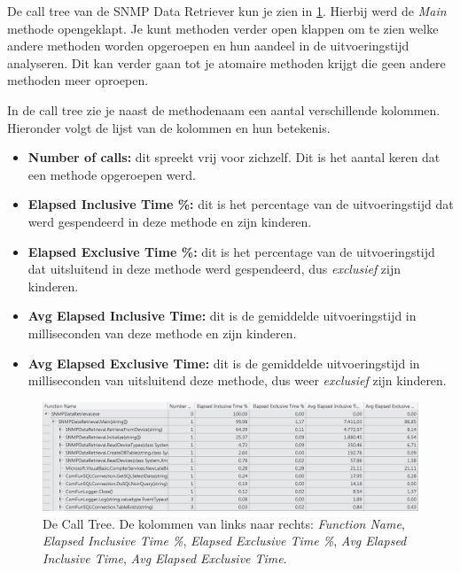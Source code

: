 De call tree van de SNMP Data Retriever kun je zien in \figurenamesentence{} \ref{call-tree}.
Hierbij werd de \emph{Main} methode opengeklapt.
Je kunt methoden verder open klappen om te zien welke andere methoden worden opgeroepen en hun aandeel in de uitvoeringstijd analyseren.
Dit kan verder gaan tot je atomaire methoden krijgt die geen andere methoden meer oproepen.

In de call tree zie je naast de methodenaam een aantal verschillende kolommen. Hieronder volgt de lijst van de kolommen en hun betekenis.

\begin{itemize}
	\item \textbf{Number of calls:}
		dit spreekt vrij voor zichzelf. Dit is het aantal keren dat een methode opgeroepen werd.
	\item \textbf{Elapsed Inclusive Time \%:}
		dit is het percentage van de uitvoeringstijd dat werd gespendeerd in deze methode en zijn kinderen.
	\item \textbf{Elapsed Exclusive Time \%:}
		dit is het percentage van de uitvoeringstijd dat uitsluitend in deze methode werd gespendeerd, dus \emph{exclusief} zijn kinderen.
	\item \textbf{Avg Elapsed Inclusive Time:}
		dit is de gemiddelde uitvoeringstijd in milliseconden van deze methode en zijn kinderen.
	\item \textbf{Avg Elapsed Exclusive Time:}
		dit is de gemiddelde uitvoeringstijd in milliseconden van uitsluitend deze methode, dus weer \emph{exclusief} zijn kinderen.
\end{itemize}

\begin{figure}[h]
	\centering
	\includegraphics[scale=0.50]{figures/profiler/call-tree}
	\caption[De Call Tree]{De Call Tree. De kolommen van links naar rechts:
		\emph{Function Name},
		\emph{Elapsed Inclusive Time \%},
		\emph{Elapsed Exclusive Time \%},
		\emph{Avg Elapsed Inclusive Time},
		\emph{Avg Elapsed Exclusive Time}.}
	\label{call-tree}
\end{figure}

